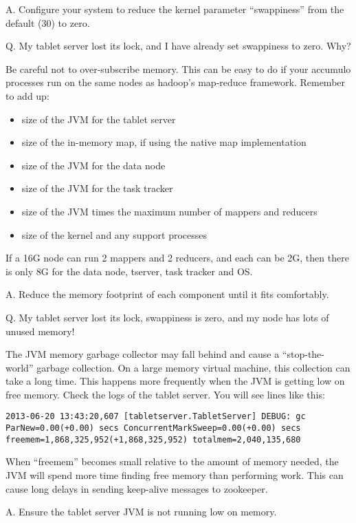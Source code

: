 A. Configure your system to reduce the kernel parameter ``swappiness'' from the default (30) to zero.

Q. My tablet server lost its lock, and I have already set swappiness to
zero.  Why?

Be careful not to over-subscribe memory.  This can be easy to do if
your accumulo processes run on the same nodes as hadoop's map-reduce
framework.  Remember to add up:

\begin{itemize}
\item{size of the JVM for the tablet server}
\item{size of the in-memory map, if using the native map implementation}
\item{size of the JVM for the data node}
\item{size of the JVM for the task tracker}
\item{size of the JVM times the maximum number of mappers and reducers}
\item{size of the kernel and any support processes}
\end{itemize}

If a 16G node can run 2 mappers and 2 reducers, and each can be 2G,
then there is only 8G for the data node, tserver, task tracker and OS.

A. Reduce the memory footprint of each component until it fits comfortably.

Q. My tablet server lost its lock, swappiness is zero, and my node has lots of unused memory!

The JVM memory garbage collector may fall behind and cause a
``stop-the-world'' garbage collection. On a large memory virtual
machine, this collection can take a long time.  This happens more
frequently when the JVM is getting low on free memory.  Check the logs
of the tablet server.  You will see lines like this:

\small
\begin{verbatim}
2013-06-20 13:43:20,607 [tabletserver.TabletServer] DEBUG: gc ParNew=0.00(+0.00) secs ConcurrentMarkSweep=0.00(+0.00) secs freemem=1,868,325,952(+1,868,325,952) totalmem=2,040,135,680
\end{verbatim}
\normalsize

When ``freemem'' becomes small relative to the amount of memory
needed, the JVM will spend more time finding free memory than
performing work.  This can cause long delays in sending keep-alive
messages to zookeeper.

A. Ensure the tablet server JVM is not running low on memory.

